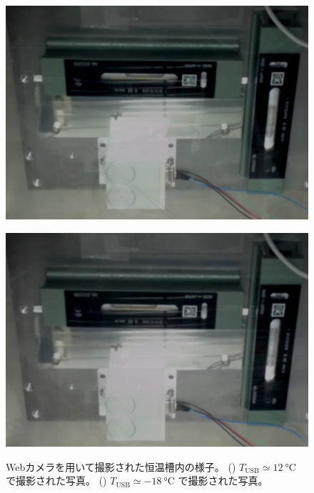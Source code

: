 \documentclass[../../main.tex]{subfiles}
\begin{document}
\begin{figure}[tbp]
    \begin{minipage}[b]{0.45\columnwidth}
        \centering
        \includegraphics[width=1.0\columnwidth]{tiltsensor/camera_12degC.pdf}
        \subcaption{}
        \label{fig:camera_12degC}
    \end{minipage}
    \hspace{0.06\columnwidth}
    \begin{minipage}[b]{0.45\columnwidth}
        \centering
        \includegraphics[width=1.0\columnwidth]{tiltsensor/camera_m18degC.pdf}
        \subcaption{}
        \label{fig:camera_m18degC}
    \end{minipage}
    \caption{Webカメラを用いて撮影された恒温槽内の様子。
             () $T_{\mathrm{USB}} \simeq \SI{12}{\degreeCelsius}$ で撮影された写真。
             () $T_{\mathrm{USB}} \simeq \SI{-18}{\degreeCelsius}$ で撮影された写真。}
    \label{fig:evaluation_bath_camera}
\end{figure}
\end{document}
